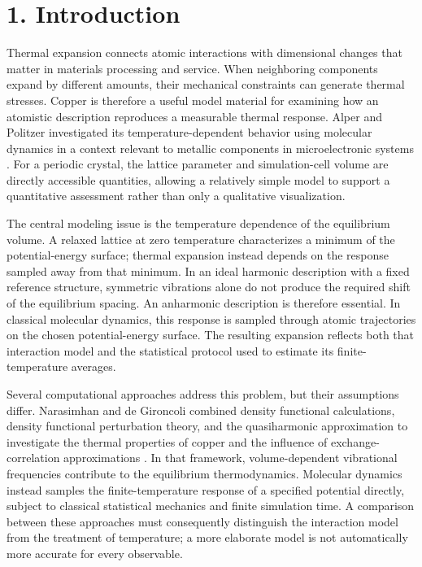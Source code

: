 \documentclass[10pt,a4paper,twocolumn]{article}
\begin{document}
\section*{1. Introduction}

Thermal expansion connects atomic interactions with dimensional changes that matter in materials processing and service. When neighboring components expand by different amounts, their mechanical constraints can generate thermal stresses. Copper is therefore a useful model material for examining how an atomistic description reproduces a measurable thermal response. Alper and Politzer investigated its temperature-dependent behavior using molecular dynamics in a context relevant to metallic components in microelectronic systems \cite{r1}. For a periodic crystal, the lattice parameter and simulation-cell volume are directly accessible quantities, allowing a relatively simple model to support a quantitative assessment rather than only a qualitative visualization.


The central modeling issue is the temperature dependence of the equilibrium volume. A relaxed lattice at zero temperature characterizes a minimum of the potential-energy surface; thermal expansion instead depends on the response sampled away from that minimum. In an ideal harmonic description with a fixed reference structure, symmetric vibrations alone do not produce the required shift of the equilibrium spacing. An anharmonic description is therefore essential. In classical molecular dynamics, this response is sampled through atomic trajectories on the chosen potential-energy surface. The resulting expansion reflects both that interaction model and the statistical protocol used to estimate its finite-temperature averages.


Several computational approaches address this problem, but their assumptions differ. Narasimhan and de Gironcoli combined density functional calculations, density functional perturbation theory, and the quasiharmonic approximation to investigate the thermal properties of copper and the influence of exchange-correlation approximations \cite{r2}. In that framework, volume-dependent vibrational frequencies contribute to the equilibrium thermodynamics. Molecular dynamics instead samples the finite-temperature response of a specified potential directly, subject to classical statistical mechanics and finite simulation time. A comparison between these approaches must consequently distinguish the interaction model from the treatment of temperature; a more elaborate model is not automatically more accurate for every observable.
\end{document}
